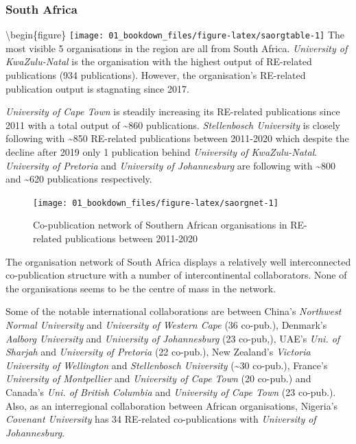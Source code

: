 \documentclass[
]{book}
\begin{document}
\hypertarget{south-africa}{%
\subsubsection{South Africa}\label{south-africa}}

\textbackslash begin\{figure\}
\texttt{[image: 01\_bookdown\_files/figure-latex/saorgtable-1]}
The most visible 5 organisations in the region are all from South Africa. \emph{University of KwaZulu-Natal} is the organisation with the highest output of RE-related publications (934 publications). However, the organisation's RE-related publication output is stagnating since 2017.

\emph{University of Cape Town} is steadily increasing its RE-related publications since 2011 with a total output of \textasciitilde860 publications. \emph{Stellenbosch University} is closely following with \textasciitilde850 RE-related publications between 2011-2020 which despite the decline after 2019 only 1 publication behind \emph{University of KwaZulu-Natal}. \emph{University of Pretoria} and \emph{University of Johannesburg} are following with \textasciitilde800 and \textasciitilde620 publications respectively.

\begin{figure}
\texttt{[image: 01\_bookdown\_files/figure-latex/saorgnet-1]} \caption{Co-publication network of Southern African organisations in RE-related publications between 2011-2020}\label{fig:saorgnet}
\end{figure}

The organisation network of South Africa displays a relatively well interconnected co-publication structure with a number of intercontinental collaborators. None of the organisations seems to be the centre of mass in the network.

Some of the notable international collaborations are between China's \emph{Northwest Normal University} and \emph{University of Western Cape} (36 co-pub.), Denmark's \emph{Aalborg University} and \emph{University of Johannesburg} (23 co-pub,), UAE's \emph{Uni. of Sharjah} and \emph{University of Pretoria} (22 co-pub.), New Zealand's \emph{Victoria University of Wellington} and \emph{Stellenbosch University} (\textasciitilde30 co-pub.), France's \emph{University of Montpellier} and \emph{University of Cape Town} (20 co-pub.) and Canada's \emph{Uni. of British Columbia} and \emph{University of Cape Town} (23 co-pub.). Also, as an interregional collaboration between African organisations, Nigeria's \emph{Covenant University} has 34 RE-related co-publications with \emph{University of Johannesburg}.
\end{document}
